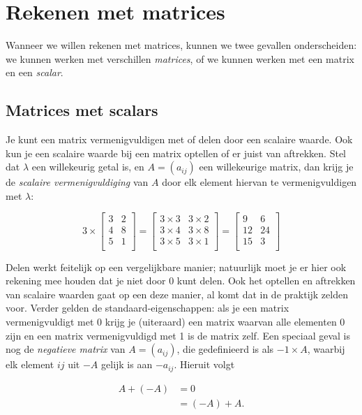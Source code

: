 
\section{Rekenen met matrices}
Wanneer we willen rekenen met matrices, kunnen we twee gevallen onderscheiden: we kunnen werken met verschillen \textit{matrices}, of we kunnen werken met een matrix en een \textit{scalar}.

\subsection{Matrices met scalars}
Je kunt een matrix vermenigvuldigen met of delen door een scalaire waarde. Ook kun je een scalaire waarde bij een matrix optellen of er juist van aftrekken. Stel dat $\lambda$ een willekeurig getal is, en $A = (a_{ij})$ een willekeurige matrix, dan krijg je de \textit{scalaire vermenigvuldiging} van $A$ door elk element hiervan te vermenigvuldigen met $\lambda$: 

\[
3 \times \begin{bmatrix}
3 & 2 \\
4 & 8 \\
5 & 1 \\
\end{bmatrix} =
\begin{bmatrix}
3 \times 3 & 3 \times 2 \\
3 \times 4 & 3 \times 8 \\
3 \times 5 & 3 \times 1\\
\end{bmatrix} =
\begin{bmatrix}
9 & 6 \\
12 & 24 \\
15 & 3 \\
\end{bmatrix}
\]

Delen werkt feitelijk op een vergelijkbare manier; natuurlijk moet je er hier ook rekening mee houden dat je niet door 0 kunt delen. Ook het optellen en aftrekken van scalaire waarden gaat op een deze manier, al komt dat in de praktijk zelden voor. Verder gelden de standaard-eigenschappen: als je een matrix vermenigvuldigt met 0 krijg je (uiteraard) een matrix waarvan alle elementen 0 zijn en een matrix vermenigvuldigd met 1 is de matrix zelf. Een speciaal geval is nog de \textit{negatieve matrix} van $A = (a_{ij})$, die gedefinieerd is als $-1 \times A$, waarbij elk element $ij$ uit $-A$ gelijk is aan $-a_{ij}$. Hieruit volgt

\[
\begin{aligned}
A + (-A) &= 0\\
&= (-A) + A.
\end{aligned}
\]


